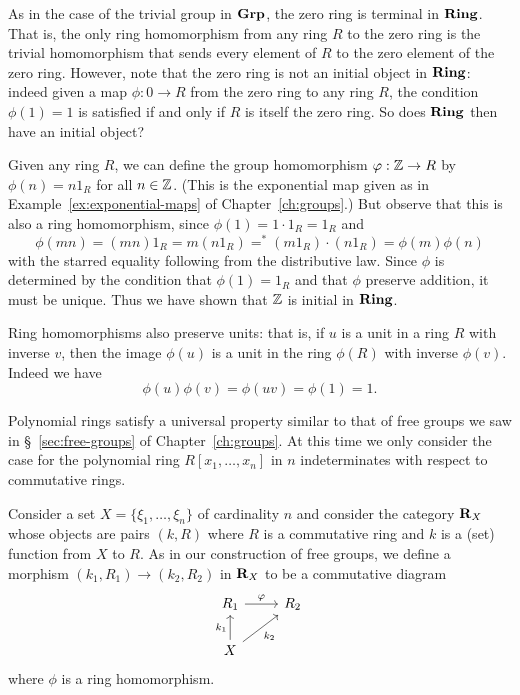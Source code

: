 As in the case of the trivial group in \(\mathbf{Grp}\), the zero ring is terminal in
\(\mathbf{Ring}\). That is, the only ring homomorphism from any ring \(R\) to the zero
ring is the trivial homomorphism that sends every element of \(R\) to the zero
element of the zero ring. However, note that the zero ring is not an initial
object in \(\mathbf{Ring}\): indeed given a map \(\phi: 0 \to R\) from the zero ring to
any ring \(R\), the condition \(\phi(1) = 1\) is satisfied if and only if \(R\)
is itself the zero ring. So does \(\mathbf{Ring}\) then have an initial object?

Given any ring \(R\), we can define the group homomorphism \(\varphi: \mathbb{Z} \to R\) by
\(\phi(n) = n1_R\) for all \(n \in \mathbb{Z}\). (This is the exponential map given as
in Example~\ref{ex:exponential-maps} of Chapter~\ref{ch:groups}.) But observe
that this is also a ring homomorphism, since \(\phi(1) = 1 \cdot 1_R = 1_R\) and
\[
    \phi(mn) = (mn)1_R = m(n1_R) =^* (m1_R)\cdot(n1_R) = \phi(m)\phi(n)
\]
with the starred equality following from the distributive law. Since \(\phi\) is
determined by the condition that \(\phi(1) = 1_R\) and that \(\phi\) preserve
addition, it must be unique. Thus we have shown that \(\mathbb{Z}\) is initial in
\(\mathbf{Ring}\).

Ring homomorphisms also preserve units: that is, if \(u\) is a unit in a ring
\(R\) with inverse \(v\), then the image \(\phi(u)\) is a unit in the ring
\(\phi(R)\) with inverse \(\phi(v)\). Indeed we have
\[
    \phi(u)\phi(v) = \phi(uv) = \phi(1) = 1.
\]

\medskip

Polynomial rings satisfy a universal property similar to that of free groups we
saw in \S~\ref{sec:free-groups} of Chapter~\ref{ch:groups}. At this time we only
consider the case for the polynomial ring \(R[x_1, \ldots, x_n]\) in \(n\)
indeterminates with respect to commutative rings.

Consider a set \(X = \{\xi_1, \ldots, \xi_n\}\) of cardinality \(n\) and
consider the category \(\mathbf{R}_X\) whose objects are pairs \((k, R)\) where
\(R\) is a commutative ring and \(k\) is a (set) function from \(X\) to \(R\).
As in our construction of free groups, we define a morphism \((k_1, R_1) \to
(k_2, R_2)\) in \(\mathbf{R}_X\) to be a commutative diagram
\[
    \begin{tikzcd}
        R_1 \ar[r, "\phi"] & R_2\\
         X \ar[u, "k_1"] \ar[ur, "k_2"'] &
    \end{tikzcd}
\]
where \(\phi\) is a ring homomorphism.

